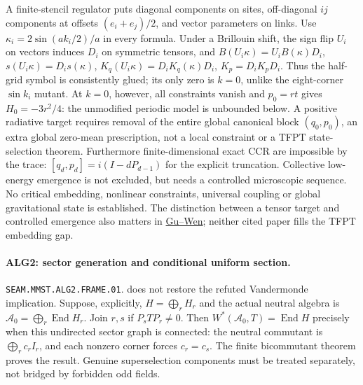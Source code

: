 A finite-stencil regulator puts diagonal components on sites, off-diagonal
$ij$ components at offsets $(e_i+e_j)/2$, and vector parameters on links.
Use $\kappa_i=2\sin(ak_i/2)/a$ in every formula. Under a Brillouin shift,
the sign flip $U_i$ on vectors induces $D_i$ on symmetric tensors, and
$B(U_i\kappa)=U_iB(\kappa)D_i$, $s(U_i\kappa)=D_is(\kappa)$,
$K_q(U_i\kappa)=D_iK_q(\kappa)D_i$, $K_p=D_iK_pD_i$.
Thus the half-grid symbol is consistently glued; its only zero is $k=0$,
unlike the eight-corner $\sin k_i$ mutant.
At $k=0$, however, all constraints vanish and $p_0=rt$ gives
$H_0=-3r^2/4$: the unmodified periodic model is unbounded below.
A positive radiative target requires removal of the entire global
canonical block $(q_0,p_0)$, an extra global zero-mean prescription,
not a local constraint or a TFPT state-selection theorem.
Furthermore finite-dimensional exact CCR are impossible by the trace:
$[q_d,p_d]=i(I-dP_{d-1})$ for the explicit truncation. Collective low-energy
emergence is not excluded, but needs a controlled microscopic sequence.
No critical embedding, nonlinear constraints, universal coupling or global
gravitational state is established. The distinction between a tensor
target and controlled emergence also matters in
\href{https://arxiv.org/abs/0907.1203}{Gu--Wen}; neither cited paper fills
the TFPT embedding gap.

\paragraph{ALG2: sector generation and conditional uniform section.}
\texttt{SEAM.MMST.ALG2.FRAME.01}.
does not restore the refuted Vandermonde implication. Suppose, explicitly,
$H=\bigoplus_rH_r$ and the actual neutral algebra is
$\mathcal A_0=\bigoplus_r\operatorname{End}H_r$. Join $r,s$ if
$P_sTP_r\ne0$. Then $W^*(\mathcal A_0,T)=\operatorname{End}H$ precisely
when this undirected sector graph is connected: the neutral commutant is
$\bigoplus_rc_rI_r$, and each nonzero corner forces $c_r=c_s$.
The finite bicommutant theorem proves the result. Genuine superselection
components must be treated separately, not bridged by forbidden odd fields.


